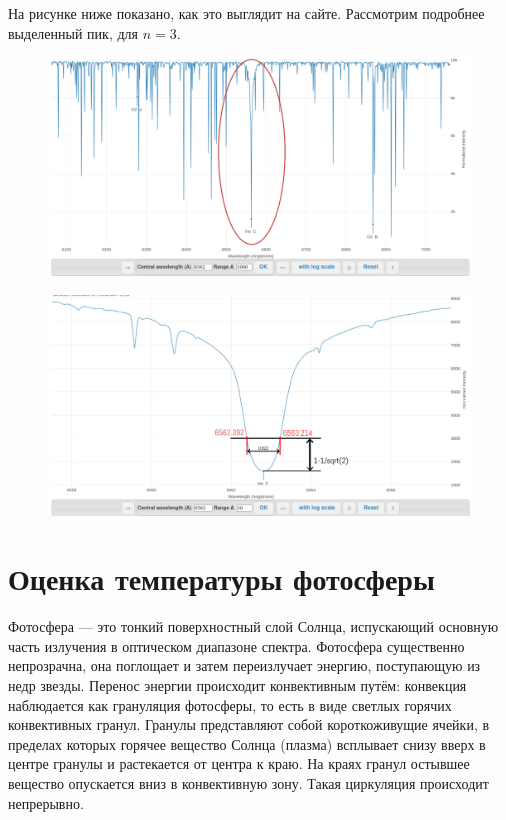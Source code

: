\documentclass[a4paper,12pt]{article}
\begin{document}
На рисунке ниже показано, как это выглядит на сайте. Рассмотрим подробнее выделенный пик, для $n = 3$.

\begin{figure}[H]
		\centering
		\includegraphics[width=160mm]{Images/1.png}
\end{figure}

\begin{figure}[H]
		\centering
		\includegraphics[width=160mm]{Images/2.png}
\end{figure}

\section*{Оценка температуры фотосферы}
Фотосфера --- это тонкий поверхностный слой Солнца, испускающий основную часть излучения в оптическом диапазоне спектра. Фотосфера существенно непрозрачна, она поглощает и затем переизлучает энергию, поступающую из недр звезды. Перенос энергии происходит конвективным путём: конвекция наблюдается как грануляция фотосферы, то есть в виде светлых горячих конвективных гранул. Гранулы представляют собой короткоживущие ячейки, в пределах которых горячее вещество Солнца (плазма) всплывает снизу вверх в центре гранулы и растекается от центра к краю. На краях гранул остывшее вещество опускается вниз в конвективную зону. Такая циркуляция происходит непрерывно.
\end{document}
